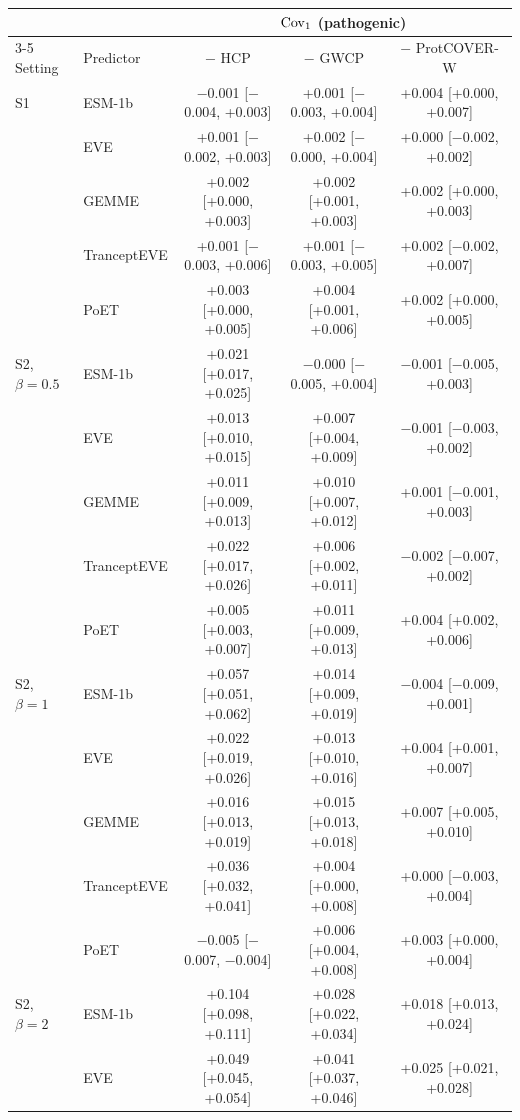 \begin{tabular}{llccc}
\toprule
 & & \multicolumn{3}{c}{$\mathrm{Cov}_1$ (pathogenic)} \\
\cmidrule(lr){3-5}
Setting & Predictor & $-$ HCP & $-$ GWCP & $-$ ProtCOVER-W \\
\midrule
S1 & ESM-1b & $-$0.001 [$-$0.004, +0.003] & +0.001 [$-$0.003, +0.004] & +0.004 [+0.000, +0.007] \\
 & EVE & +0.001 [$-$0.002, +0.003] & +0.002 [$-$0.000, +0.004] & +0.000 [$-$0.002, +0.002] \\
 & GEMME & +0.002 [+0.000, +0.003] & +0.002 [+0.001, +0.003] & +0.002 [+0.000, +0.003] \\
 & TranceptEVE & +0.001 [$-$0.003, +0.006] & +0.001 [$-$0.003, +0.005] & +0.002 [$-$0.002, +0.007] \\
 & PoET & +0.003 [+0.000, +0.005] & +0.004 [+0.001, +0.006] & +0.002 [+0.000, +0.005] \\
\midrule
S2, $\beta=0.5$ & ESM-1b & +0.021 [+0.017, +0.025] & $-$0.000 [$-$0.005, +0.004] & $-$0.001 [$-$0.005, +0.003] \\
 & EVE & +0.013 [+0.010, +0.015] & +0.007 [+0.004, +0.009] & $-$0.001 [$-$0.003, +0.002] \\
 & GEMME & +0.011 [+0.009, +0.013] & +0.010 [+0.007, +0.012] & +0.001 [$-$0.001, +0.003] \\
 & TranceptEVE & +0.022 [+0.017, +0.026] & +0.006 [+0.002, +0.011] & $-$0.002 [$-$0.007, +0.002] \\
 & PoET & +0.005 [+0.003, +0.007] & +0.011 [+0.009, +0.013] & +0.004 [+0.002, +0.006] \\
\midrule
S2, $\beta=1$ & ESM-1b & +0.057 [+0.051, +0.062] & +0.014 [+0.009, +0.019] & $-$0.004 [$-$0.009, +0.001] \\
 & EVE & +0.022 [+0.019, +0.026] & +0.013 [+0.010, +0.016] & +0.004 [+0.001, +0.007] \\
 & GEMME & +0.016 [+0.013, +0.019] & +0.015 [+0.013, +0.018] & +0.007 [+0.005, +0.010] \\
 & TranceptEVE & +0.036 [+0.032, +0.041] & +0.004 [+0.000, +0.008] & +0.000 [$-$0.003, +0.004] \\
 & PoET & $-$0.005 [$-$0.007, $-$0.004] & +0.006 [+0.004, +0.008] & +0.003 [+0.000, +0.004] \\
\midrule
S2, $\beta=2$ & ESM-1b & +0.104 [+0.098, +0.111] & +0.028 [+0.022, +0.034] & +0.018 [+0.013, +0.024] \\
 & EVE & +0.049 [+0.045, +0.054] & +0.041 [+0.037, +0.046] & +0.025 [+0.021, +0.028] \\

\end{tabular}
